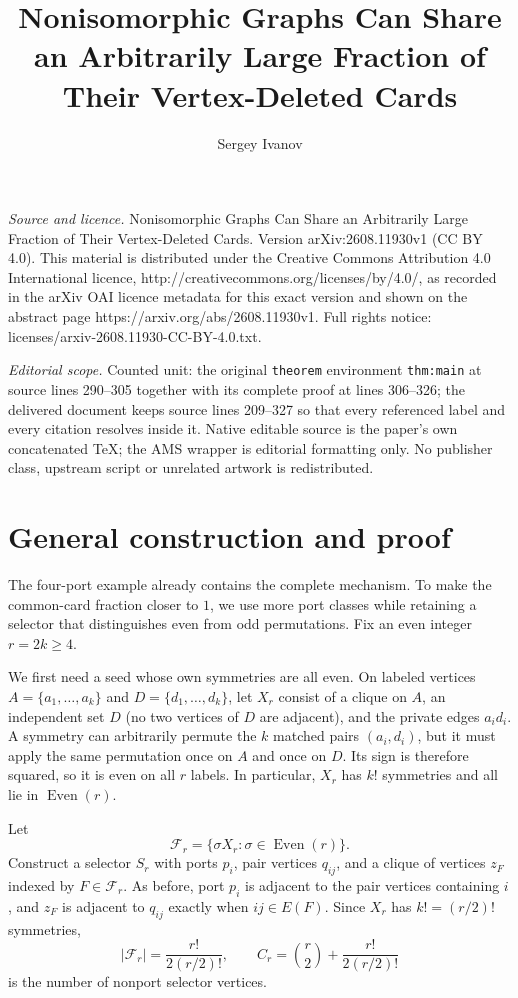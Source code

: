\documentclass[10pt,a4paper]{amsart}
\newcommand{\Even}{\operatorname{Even}}
\begin{document}
\title[Nonisomorphic Graphs Can Share an Arbitrarily Large Fraction]{Nonisomorphic Graphs Can Share an Arbitrarily Large Fraction of Their Vertex-Deleted Cards}
\author{Sergey Ivanov}
\date{}
\maketitle
\noindent\emph{Source and licence.} Nonisomorphic Graphs Can Share an Arbitrarily Large Fraction of Their Vertex-Deleted Cards. Version arXiv:2608.11930v1 (CC BY 4.0). This material is distributed under the Creative Commons Attribution 4.0 International licence, http://creativecommons.org/licenses/by/4.0/, as recorded in the arXiv OAI licence metadata for this exact version and shown on the abstract page https://arxiv.org/abs/2608.11930v1. Full rights notice: licenses/arxiv-2608.11930-CC-BY-4.0.txt.\par\smallskip
\noindent\textit{Editorial scope.} Counted unit: the original \texttt{theorem} environment \texttt{thm:main} at source lines 290--305 together with its complete proof at lines 306--326; the delivered document keeps source lines 209--327 so that every referenced label and every citation resolves inside it. Native editable source is the paper's own concatenated TeX; the AMS wrapper is editorial formatting only. No publisher class, upstream script or unrelated artwork is redistributed.
\section{General construction and proof}\label{sec:general}
The four-port example already contains the complete mechanism. To make the common-card fraction closer
to $1$, we use more port classes while retaining a selector that distinguishes even from odd
permutations. Fix an even integer $r=2k\ge4$.

We first need a seed whose own symmetries are all even. On labeled vertices
$A=\{a_1,\ldots,a_k\}$ and $D=\{d_1,\ldots,d_k\}$, let $X_r$ consist of a clique on $A$, an independent
set $D$ (no two vertices of $D$ are adjacent), and the private edges $a_i d_i$. A symmetry can
arbitrarily permute the $k$ matched pairs
$(a_i,d_i)$, but it must apply the same permutation once on $A$ and once on $D$. Its sign is therefore
squared, so it is even on all $r$ labels. In particular, $X_r$ has $k!$ symmetries and all lie in
$\Even(r)$.

Let
\[
 \mathcal F_r=\{\sigma X_r:\sigma\in\Even(r)\}.
\]
Construct a selector $S_r$ with ports $p_i$, pair vertices $q_{ij}$, and a clique of vertices $z_F$
indexed by $F\in\mathcal F_r$. As before, port $p_i$ is adjacent to the pair vertices containing $i$,
and $z_F$ is adjacent to $q_{ij}$ exactly when $ij\in E(F)$. Since $X_r$ has $k!=(r/2)!$
symmetries,
\[
 |\mathcal F_r|=\frac{r!}{2(r/2)!},\qquad
 C_r=\binom r2+\frac{r!}{2(r/2)!}
\]
is the number of nonport selector vertices.
\end{document}
